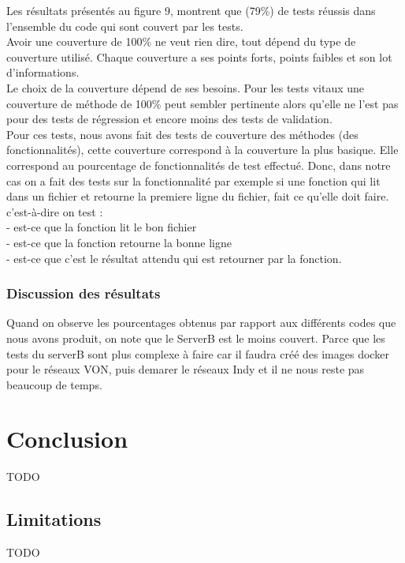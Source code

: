 \documentclass[12pt, openany]{report}
\begin{document}
\begin{flushleft}
Les résultats présentés au figure 9, montrent que (79\%) de tests réussis dans l'ensemble du code qui sont couvert par les tests. \\
Avoir une couverture de 100\% ne veut rien dire, tout dépend du type de couverture utilisé. Chaque couverture a ses points forts, points faibles et son lot d’informations.\\
Le choix de la couverture dépend de ses besoins.
Pour les tests vitaux une couverture de méthode de 100\% peut sembler pertinente alors qu’elle ne l’est pas pour des tests de régression et encore moins des tests de validation. \\
Pour ces tests, nous avons fait des tests de couverture des méthodes (des fonctionnalités), cette couverture correspond à la couverture la plus basique. Elle correspond au pourcentage de fonctionnalités  de test effectué.
Donc, dans notre cas on a fait des tests sur la fonctionnalité  par exemple si une fonction qui lit dans un fichier et retourne la premiere ligne du fichier, fait ce qu'elle doit faire.\\
c'est-à-dire on test : \\
- est-ce que la fonction lit le bon fichier\\
- est-ce que la fonction retourne la bonne ligne\\
- est-ce que c'est le résultat attendu qui est retourner par la fonction.\\


\subsubsection{Discussion des résultats}
Quand on observe les pourcentages obtenus par rapport aux différents codes que nous avons produit, on note que le ServerB est le moins couvert. Parce que les tests du serverB sont plus complexe à faire car il faudra créé des images docker pour le réseaux VON, puis demarer le réseaux Indy et il ne nous reste pas beaucoup de temps.


\end{flushleft}


\section{Conclusion}
\noindent 
\begin{flushleft}
TODO
\end{flushleft}
\subsection{Limitations}
\noindent 
\begin{flushleft}
TODO
\end{flushleft}
\end{document}
